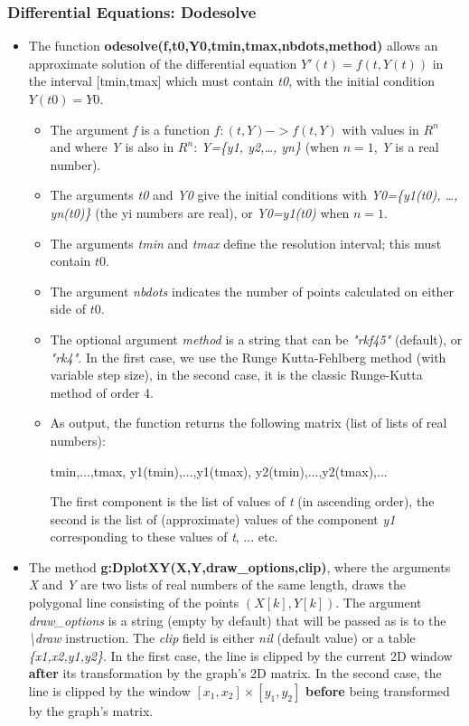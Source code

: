 \subsubsection{Differential Equations: Dodesolve}

\begin{itemize}
    \item The function \textbf{odesolve(f,t0,Y0,tmin,tmax,nbdots,method)} allows an approximate solution of the differential equation \(Y'(t)=f(t,Y(t))\) in the interval {[}tmin,tmax{]} which must contain \emph{t0}, with the initial condition $Y(t0)=Y0$.

\begin{itemize}
    \item The argument \emph{f} is a function \(f: (t,Y) -> f(t,Y)\) with values ​​in \(R^n\) and where \emph{Y} is also in \(R^n\): \emph{Y=\{y1, y2,\ldots, yn\}} (when $n=1$, \emph{Y} is a real number).
    \item The arguments \emph{t0} and \emph{Y0} give the initial conditions with \emph{Y0=\{y1(t0), \ldots, yn(t0)\}} (the yi numbers are real), or \emph{Y0=y1(t0)} when $n=1$.
    \item The arguments \emph{tmin} and \emph{tmax} define the resolution interval; this must contain \(t0\).
    \item The argument \emph{nbdots} indicates the number of points calculated on either side of \(t0\).
    \item The optional argument \emph{method} is a string that can be \emph{"rkf45"} (default), or \emph{"rk4"}. In the first case, we use the Runge Kutta-Fehlberg method (with variable step size), in the second case, it is the classic Runge-Kutta method of order 4.
    \item As output, the function returns the following matrix (list of lists of real numbers):

\begin{TeXcode}
{ {tmin,...,tmax}, {y1(tmin),...,y1(tmax)}, {y2(tmin),...,y2(tmax)},...}
\end{TeXcode}

The first component is the list of values ​​of \emph{t} (in ascending order), the second is the list of (approximate) values ​​of the component \emph{y1} corresponding to these values ​​of \emph{t}, ... etc.
\end{itemize}

    \item The method \textbf{g:DplotXY(X,Y,draw\_options,clip)}, where the arguments \emph{X} and \emph{Y} are two lists of real numbers of the same length, draws the polygonal line consisting of the points $(X[k],Y[k])$. The argument \emph{draw\_options} is a string (empty by default) that will be passed as is to the \emph{\textbackslash draw} instruction. The \emph{clip} field is either \emph{nil} (default value) or a table \emph{\{x1,x2,y1,y2\}}. In the first case, the line is clipped by the current 2D window \textbf{after} its transformation by the graph's 2D matrix. In the second case, the line is clipped by the window $[x_1,x_2]\times[y_1,y_2]$ \textbf{before} being transformed by the graph's matrix.


\end{itemize}
